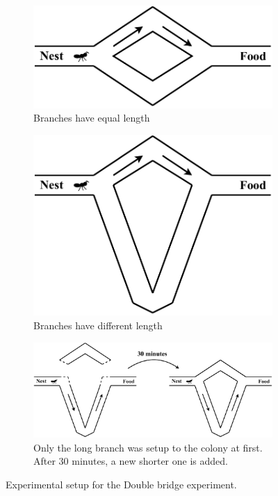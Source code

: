 \begin{figure}[htbp]
	\centering
	\begin{subfigure}{.49\linewidth}
		\centering
		\includegraphics[scale=\scalefigure]{Figures/chap 1/Ant Experiment.pdf}
		\caption{Branches have equal length}
		\label{fig:aco_exp_1}
	\end{subfigure}
	\begin{subfigure}{.49\linewidth}
		\centering
		\includegraphics[scale=\scalefigure]{Figures/chap 1/Ant Experiment 2.pdf}
		\caption{Branches have different length}
		\label{fig:aco_exp_2}
	\end{subfigure}

	\begin{subfigure}{.95\linewidth}
		\centering
		\includegraphics[scale=\scalefigure]{Figures/chap 1/Ant Experiment 3.pdf}
		\caption{Only the long branch was setup to the colony at first. After 30 minutes, a new shorter one is added.}
		\label{fig:aco_exp_3}
	\end{subfigure}
	\caption{Experimental setup for the Double bridge experiment.}
	\label{fig:aco_exp}
\end{figure}

